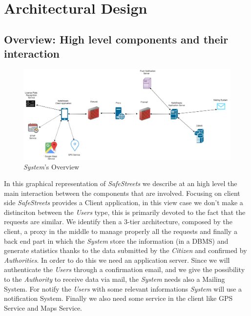\documentclass{article}
\begin{document}
\clearpage

\section{Architectural Design}

\subsection{Overview: High level components and their interaction}

\begin{figure}[H]
    \centering
    \includegraphics[scale=0.4]{img/Overview.png}
    \caption{\textit{System}'s Overview}
\end{figure}

In this graphical representation of \textit{SafeStreets} we describe at an high level the main interaction
between the components that are involved. Focusing on client side \textit{SafeStreets} provides a Client 
application, in this view case we don't make a distinciton between the \textit{Users} type, this is 
primarily devoted to the fact that the requests are similar. We identify then a 3-tier architecture, 
composed by the client, a proxy in the middle to manage properly all the requests and finally a back 
end part in which the \textit{System} store the information (in a DBMS) and generate statistics thanks
to the data submitted by the \textit{Citizen} and confirmed by \textit{Authorities}. In order to do this
we need an application server. Since we will authenticate the \textit{Users} through a confirmation email, 
and we give the possibility to the \textit{Authority} to receive data via mail, the \textit{System} needs
also a Mailing System. For notify the \textit{Users} with some relevant informations \textit{System} will 
use a notification System. Finally we also need some service in the client like GPS Service and Maps Service.
\end{document}
